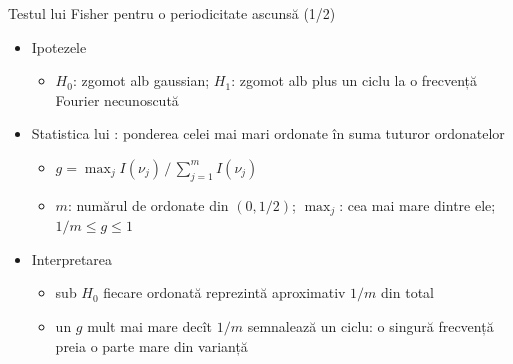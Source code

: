 \begin{frame}{Testul lui Fisher pentru o periodicitate ascunsă (1/2)}
\itemsize{\small}
\begin{itemize}
    \item Ipotezele
    \begin{itemize}
        \item $H_0$: zgomot alb gaussian; $H_1$: zgomot alb plus un ciclu la o frecvență Fourier necunoscută
    \end{itemize}
    \item Statistica lui : ponderea celei mai mari ordonate în suma tuturor ordonatelor
    \begin{itemize}
        \item $g = \max_j I(\nu_j)\,/\,\sum_{j=1}^{m} I(\nu_j)$
        \item $m$: numărul de ordonate din $(0, 1/2)$; $\max_j$: cea mai mare dintre ele; $1/m \le g \le 1$
    \end{itemize}
    \item Interpretarea
    \begin{itemize}
        \item sub $H_0$ fiecare ordonată reprezintă aproximativ $1/m$ din total
        \item un $g$ mult mai mare decît $1/m$ semnalează un ciclu: o singură frecvență preia o parte mare din varianță
    \end{itemize}
\end{itemize}
\end{frame}

